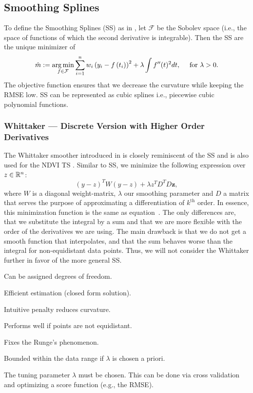 	\subsection{Smoothing Splines}
		\label{sec:Natural_SS}
		To define the Smoothing Splines (SS) as in \cite{cravenSmoothingNoisyData1978}, let $\mathcal F$ be the Sobolev space (i.e., the space of functions of which the second derivative is integrable). Then the SS are the unique minimizer of
		\begin{equation}
			\label{eq:ss}
			\hat m :=\operatorname*{arg\, min}_{f \in \mathcal F} \sum_{i=1}^{n}w_i\left(y_{i}-{f}\left(t_{i}\right)\right)^{2}+\lambda \int {f}^{\prime \prime}(t)^{2} dt,\quad \text{ for } \lambda >0.
		\end{equation}
		 The objective function ensures that we decrease the curvature while keeping the RMSE low.
		SS can be represented as cubic splines i.e., piecewise cubic polynomial functions.

		\subsubsection{Whittaker --- Discrete Version with Higher Order Derivatives}
			The Whittaker smoother introduced in \cite{eilersPerfectSmoother2003} is closely reminiscent of the SS and is also used for the NDVI TS \citep{atzbergerTimeSeriesMonitoring2011}. Similar to SS, we minimize the following expression over $z\in \mathbb{R}^n$:
			$$
			({y}-{z})^{{T}} {W}({y}-{z})+\lambda {z}^{{T}} {D}^{{T}} {D} \mathbf{z},
			$$
			where $W$ is a diagonal weight-matrix, $\lambda$ our smoothing parameter and $D$ a matrix that serves the purpose of approximating a differentiation of $k^\text{th}$ order. In essence, this minimization function is the same as equation~. The only differences are, that we substitute the integral by a sum and that we are more flexible with the order of the derivatives we are using. The main drawback is that we do not get a smooth function that interpolates, and that the sum behaves worse than the integral for non-equidistant data points. Thus, we will not consider the Whittaker further in favor of the more general SS. 

		\begin{my_pros_cons_table}{
				\item Can be assigned degrees of freedom.
				\item Efficient estimation (closed form solution).
				\item Intuitive penalty reduces curvature.
				\item Performs well if points are not equidistant.
				\item Fixes the Runge's phenomenon\footnotemark.
				\item Bounded within the data range if $\lambda$ is chosen a priori.
			}{
				\item The tuning parameter $\lambda$ must be chosen. This can be done via cross validation and optimizing a score function (e.g., the RMSE). 
			}
		\end{my_pros_cons_table}


